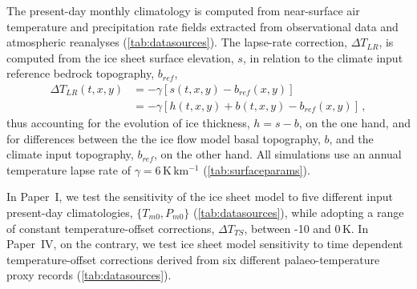 \documentclass{article}
\newcommand{\unit}[1]{\ensuremath{\mathrm{#1}}}
\newcommand{\CCLI}[0]{Paper~I}      %
\newcommand{\CCYC}[0]{Paper~IV}     %
\begin{document}
The present-day monthly climatology is computed from
near-surface air temperature and precipitation rate fields extracted from
observational data and atmospheric reanalyses (\cref{tab:datasources}).
The lapse-rate correction, ${\Delta}T_{LR}$, is computed from the ice sheet
surface elevation, $s$, in relation to the
climate input reference bedrock topography, $b_{ref}$,
\begin{align}
    {\Delta}T_{LR}(t, x, y) &= -\gamma [s(t, x, y)-b_{ref}(x, y)] \\
                            &= -\gamma [h(t, x, y)+b(t, x, y)-b_{ref}(x, y)]\,,
\end{align}
thus accounting for the evolution of ice thickness, ${h=s-b}$, on the one hand,
and
for differences between the the ice flow model basal topography, $b$, and the
climate input topography, $b_{ref}$, on the other hand. All simulations use an
annual temperature lapse rate of $\gamma = 6\,\unit{K\,km^{-1}}$
(\cref{tab:surfaceparams}).

In \CCLI, we test the sensitivity of the ice sheet model to five different
input present-day climatologies, $\{T_{m0}, P_{m0}\}$ (\cref{tab:datasources}),
while adopting a range of constant temperature-offset corrections,
${\Delta}T_{TS}$, between -10 and 0\,K. In \CCYC, on the contrary, we test ice
sheet model sensitivity to time dependent temperature-offset corrections
derived from six different palaeo-temperature proxy records
(\cref{tab:datasources}).
\end{document}
